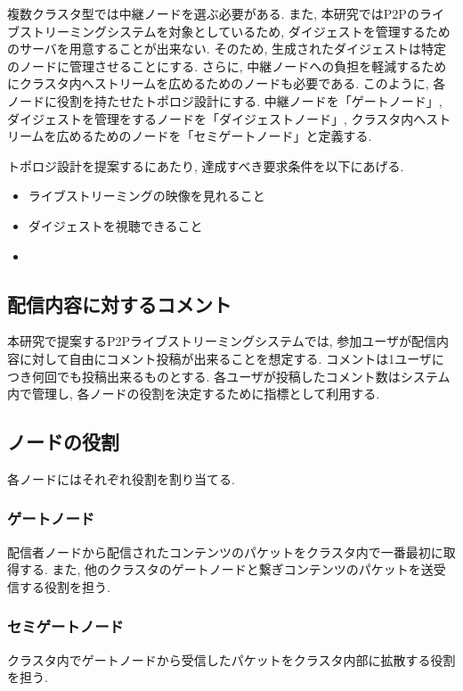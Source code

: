複数クラスタ型では中継ノードを選ぶ必要がある. また, 本研究ではP2Pのライブストリーミングシステムを対象としているため, ダイジェストを管理するためのサーバを用意することが出来ない. そのため, 生成されたダイジェストは特定のノードに管理させることにする. さらに, 中継ノードへの負担を軽減するためにクラスタ内へストリームを広めるためのノードも必要である. このように, 各ノードに役割を持たせたトポロジ設計にする. 中継ノードを「ゲートノード」, ダイジェストを管理をするノードを「ダイジェストノード」, クラスタ内へストリームを広めるためのノードを「セミゲートノード」と定義する.

トポロジ設計を提案するにあたり, 達成すべき要求条件を以下にあげる.

\begin{itemize}
\item ライブストリーミングの映像を見れること
\item ダイジェストを視聴できること
\item
\end{itemize}


\subsection{配信内容に対するコメント}

本研究で提案するP2Pライブストリーミングシステムでは, 参加ユーザが配信内容に対して自由にコメント投稿が出来ることを想定する. コメントは1ユーザにつき何回でも投稿出来るものとする. 各ユーザが投稿したコメント数はシステム内で管理し, 各ノードの役割を決定するために指標として利用する.

\subsection{ノードの役割}
各ノードにはそれぞれ役割を割り当てる.

\subsubsection{ゲートノード}
配信者ノードから配信されたコンテンツのパケットをクラスタ内で一番最初に取得する. また, 他のクラスタのゲートノードと繋ぎコンテンツのパケットを送受信する役割を担う.

\subsubsection{セミゲートノード}
クラスタ内でゲートノードから受信したパケットをクラスタ内部に拡散する役割を担う.

